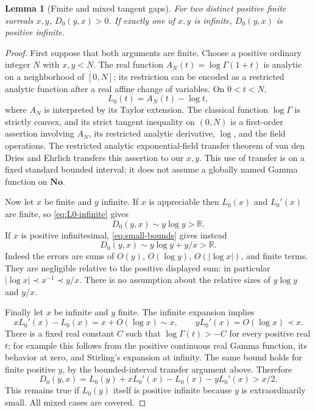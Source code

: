 \documentclass[11pt,letterpaper]{article}
\numberwithin{equation}{section}
\theoremstyle{plain}
\newtheorem{lemma}[lemma]{Lemma}
\theoremstyle{definition}
\theoremstyle{remark}
\newcommand{\No}{\mathbf{No}}
\newcommand{\R}{\mathbb R}
\newcommand{\abs}[1]{\lvert#1\rvert}
\begin{document}
\begin{lemma}[Finite and mixed tangent gaps]\label{lem:mixed-gaps}
For two distinct positive finite surreals $x,y$, $D_0(y,x)>0$.
If exactly one of $x,y$ is infinite, $D_0(y,x)$ is positive infinite.
\end{lemma}

\begin{proof}
First suppose that both arguments are finite. Choose a positive ordinary
integer $N$ with $x,y<N$. The real function
$A_N(t)=\log\Gamma(1+t)$ is analytic on a neighborhood of $[0,N]$;
its restriction can be encoded as a restricted analytic function after a
real affine change of variables. On $0<t<N$,
\[
 L_0(t)=A_N(t)-\log t,
\]
where $A_N$ is interpreted by its Taylor extension.
The classical function $\log\Gamma$ is strictly convex, and its strict
tangent inequality on $(0,N)$ is a first-order assertion involving $A_N$,
its restricted analytic derivative, $\log$, and the field operations.
The restricted analytic exponential-field transfer theorem of
van den Dries and Ehrlich \cite{vdDE} transfers this assertion to our
$x,y$. This use of transfer is on a fixed standard bounded interval;
it does not assume a globally named Gamma function on $\No$.

Now let $x$ be finite and $y$ infinite. If $x$ is appreciable then $L_0(x)$
and $L_0'(x)$ are finite, so \eqref{eq:L0-infinite} gives
\[
 D_0(y,x)\sim y\log y>\R.
\]
If $x$ is positive infinitesimal, \eqref{eq:small-bounds} gives instead
\[
 D_0(y,x)\sim y\log y+y/x>\R.
\]
Indeed the errors are sums of $O(y)$, $O(\log y)$,
$O(\abs{\log x})$, and finite terms. They are negligible relative to the
positive displayed sum: in particular
$\abs{\log x}\prec x^{-1}\prec y/x$.
There is no assumption about the relative sizes of $y\log y$ and $y/x$.

Finally let $x$ be infinite and $y$ finite. The infinite expansion implies
\[
 xL_0'(x)-L_0(x)=x+O(\log x)\sim x,
 \qquad yL_0'(x)=O(\log x)\prec x.
\]
There is a fixed real constant $C$ such that
$\log\Gamma(t)>-C$ for every positive real $t$; for example this follows
from the positive continuous real Gamma function, its behavior at zero,
and Stirling's expansion at infinity. The same bound holds for finite
positive $y$, by the bounded-interval transfer argument above. Therefore
\[
 D_0(y,x)=L_0(y)+xL_0'(x)-L_0(x)-yL_0'(x)>x/2.
\]
This remains true if $L_0(y)$ itself is positive infinite because $y$ is
extraordinarily small. All mixed cases are covered.
\end{proof}
\end{document}
